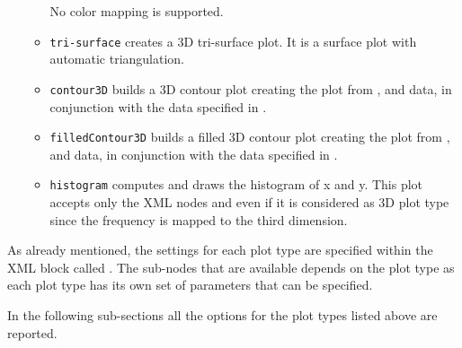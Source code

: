 \begin{itemize}
\begin{itemize}
    No color mapping is supported.
    \item \texttt{tri-surface} creates a 3D tri-surface plot.
    It is a surface plot with automatic triangulation.
    \item \texttt{contour3D} builds a 3D contour plot creating the plot from
    ,  and  data, in conjunction with the data
    specified in .
    \item \texttt{filledContour3D} builds a filled 3D contour plot creating the
    plot from ,  and  data, in conjunction with
    the data specified in .
    \item \texttt{histogram} computes and draws the histogram of x and y.
    \nb This plot accepts only the XML nodes  and  even if
    it is considered as 3D plot type since the frequency is mapped to the third
    dimension.
  \end{itemize}
\end{itemize}

As already mentioned, the settings for each plot type are specified within the
XML block called .
%
The sub-nodes that are available depends on the plot type as each plot type has
its own set of parameters that can be specified.

In the following sub-sections all the options for the plot types listed above
are reported.

